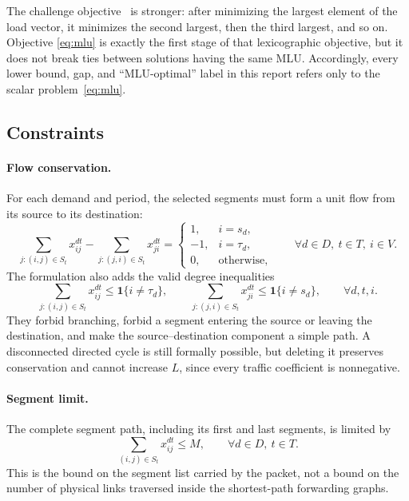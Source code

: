 The challenge objective~\citep{orange2026} is stronger: after minimizing the largest element of the
load vector, it minimizes the second largest, then the third largest, and so on. Objective
\eqref{eq:mlu} is exactly the first stage of that lexicographic objective, but it does not break ties
between solutions having the same MLU. Accordingly, every lower bound, gap, and ``MLU-optimal'' label
in this report refers only to the scalar problem~\eqref{eq:mlu}.

\subsection{Constraints}

\paragraph{Flow conservation.}
For each demand and period, the selected segments must form a unit flow from its source to its
destination:
\begin{equation}
\sum_{j:(i,j)\in S_t} x^{dt}_{ij}-\sum_{j:(j,i)\in S_t} x^{dt}_{ji}=
\begin{cases}
1, & i=s_d,\\
-1, & i=\tau_d,\\
0, & \text{otherwise,}
\end{cases}
\qquad \forall d\in D,\ t\in T,\ i\in V.
\label{eq:flow}
\end{equation}
The formulation also adds the valid degree inequalities
\begin{equation}
\sum_{j:(i,j)\in S_t} x^{dt}_{ij}\le \mathbf{1}\{i\neq\tau_d\},
\qquad
\sum_{j:(j,i)\in S_t} x^{dt}_{ji}\le \mathbf{1}\{i\neq s_d\},
\qquad \forall d,t,i.
\label{eq:degree}
\end{equation}
They forbid branching, forbid a segment entering the source or leaving the destination, and make the
source--destination component a simple path. A disconnected directed cycle is still formally
possible, but deleting it preserves conservation and cannot increase $L$, since every traffic
coefficient is nonnegative.

\paragraph{Segment limit.}
The complete segment path, including its first and last segments, is limited by
\begin{equation}
\sum_{(i,j)\in S_t} x^{dt}_{ij}\le M,\qquad \forall d\in D,\ t\in T.
\label{eq:segments}
\end{equation}
This is the bound on the segment list carried by the packet, not a bound on the number of physical
links traversed inside the shortest-path forwarding graphs.

